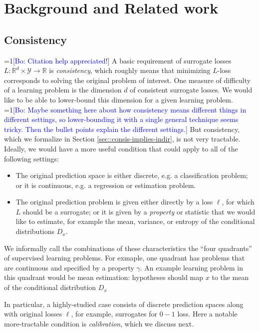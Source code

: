 \documentclass{article}
\newcommand{\Comments}{1}
\newcommand{\mynote}[2]{\ifnum\Comments=1\textcolor{#1}{#2}\fi}
\newcommand{\bo}[1]{\mynote{blue}{[Bo: #1]}}
\newcommand{\reals}{\mathbb{R}}
\newcommand{\Y}{\mathcal{Y}}
\begin{document}
\section{Background and Related work}\label{sec:related-work}

\subsection{Consistency} \label{subsec:consistency}

\bo{Citation help appreciated!}
A basic requirement of surrogate losses $L: \reals^d \times \Y \to \reals$ is \emph{consistency}, which roughly means that minimizing $L$-loss corresponds to solving the original problem of interest.
One measure of difficulty of a learning problem is the dimension $d$ of consistent surrogate losses.
We would like to be able to lower-bound this dimension for a given learning problem.
\bo{Maybe something here about how consistency means different things in different settings, so lower-bounding it with a single general technique seems tricky. Then the bullet points explain the different settings.}
But consistency, which we formalize in Section \ref{sec::consis-implies-indir}, is not very tractable.
Ideally, we would have a more useful condition that could apply to all of the following settings:
\begin{itemize}
  \item The original prediction space is either discrete, e.g. a classification problem; or it is continuous, e.g. a regression or estimation problem.
  \item The original prediction problem is given either directly by a loss $\ell$, for which $L$ should be a surrogate; or it is given by a \emph{property} or statistic that we would like to estimate, for example the mean, variance, or entropy of the conditional distributions $D_x$.
\end{itemize}
We informally call the combinations of these characteristics the ``four quadrants'' of supervised learning problems.
For exmaple, one quadrant has problems that are continuous and specified by a property $\gamma$.
An example learning problem in this quadrant would be mean estimation: hypotheses should map $x$ to the mean of the conditional distribution $D_x$

In particular, a highly-studied case consists of discrete prediction spaces along with original losses $\ell$, for example, surrogates for $0-1$ loss.
Here a notable more-tractable condition is \emph{calibration}, which we discuss next.
\end{document}
